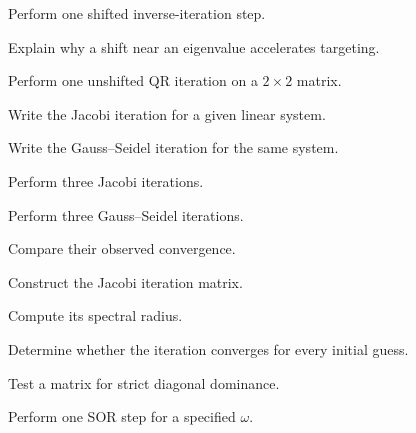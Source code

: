 \begin{exercise}[3]
Perform one shifted inverse-iteration step.
\end{exercise}

\begin{exercise}[3]
Explain why a shift near an eigenvalue accelerates targeting.
\end{exercise}

\begin{exercise}[3]
Perform one unshifted QR iteration on a \(2\times2\) matrix.
\end{exercise}

\begin{exercise}[2]
Write the Jacobi iteration for a given linear system.
\end{exercise}

\begin{exercise}[2]
Write the Gauss--Seidel iteration for the same system.
\end{exercise}

\begin{exercise}[3]
Perform three Jacobi iterations.
\end{exercise}

\begin{exercise}[3]
Perform three Gauss--Seidel iterations.
\end{exercise}

\begin{exercise}[3]
Compare their observed convergence.
\end{exercise}

\begin{exercise}[3]
Construct the Jacobi iteration matrix.
\end{exercise}

\begin{exercise}[3]
Compute its spectral radius.
\end{exercise}

\begin{exercise}[3]
Determine whether the iteration converges for every initial guess.
\end{exercise}

\begin{exercise}[3]
Test a matrix for strict diagonal dominance.
\end{exercise}

\begin{exercise}[3]
Perform one SOR step for a specified \(\omega\).
\end{exercise}

